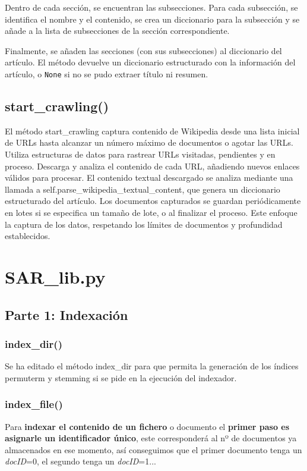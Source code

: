 \documentclass[12pt,a4paper]{article}
\begin{document}
Dentro de cada sección, se encuentran las subsecciones. Para cada subsección, se identifica el nombre y el contenido, se crea un diccionario para la subsección y se añade a la lista de subsecciones de la sección correspondiente.

Finalmente, se añaden las secciones (con sus subsecciones) al diccionario del artículo. El método devuelve un diccionario estructurado con la información del artículo, o \texttt{None} si no se pudo extraer título ni resumen.

\subsection{start\_crawling()}
El método start\_crawling captura contenido de Wikipedia desde una lista inicial de URLs hasta alcanzar un número máximo de documentos o agotar las URLs. Utiliza estructuras de datos para rastrear URLs visitadas, pendientes y en proceso. Descarga y analiza el contenido de cada URL, añadiendo nuevos enlaces válidos para procesar. El contenido textual descargado se analiza mediante una llamada a self.parse\_wikipedia\_textual\_content, que genera un diccionario estructurado del artículo. Los documentos capturados se guardan periódicamente en lotes si se especifica un tamaño de lote, o al finalizar el proceso. Este enfoque la captura de los datos, respetando los límites de documentos y profundidad establecidos.


\section{SAR\_lib.py}
\subsection{Parte 1: Indexación}
\subsubsection{index\_dir()}
Se ha editado el método index\_dir para que permita la generación de los índices permuterm y stemming si se pide en la ejecución del indexador.

\subsubsection{index\_file()}
Para \textbf{indexar el contenido de un fichero} o documento el \textbf{primer paso es asignarle un identificador único}, este corresponderá al nº de documentos ya almacenados en ese momento, así conseguimos que el primer documento tenga un \textit{docID}=0, el segundo tenga un \textit{docID}=1... 
\end{document}
